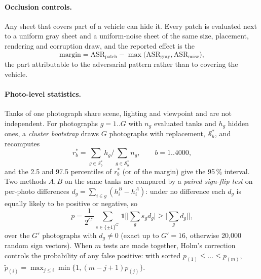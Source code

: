 \documentclass[11pt,a4paper]{article}
\begin{document}
\paragraph{Occlusion controls.} Any sheet that covers part of a vehicle can hide it. Every patch is evaluated next to a uniform gray sheet and a uniform-noise sheet of the same size, placement, rendering and corruption draw, and the reported effect is the
\begin{equation}
\text{margin}=\mathrm{ASR}_{\text{patch}}-\max\big(\mathrm{ASR}_{\text{gray}},\mathrm{ASR}_{\text{noise}}\big),
\end{equation}
the part attributable to the adversarial pattern rather than to covering the vehicle.

\paragraph{Photo-level statistics.} Tanks of one photograph share scene, lighting and viewpoint and are not independent. For photographs $g=1..G$ with $n_g$ evaluated tanks and $h_g$ hidden ones, a \emph{cluster bootstrap} \cite{efron1993,field2007} draws $G$ photographs with replacement, $\mathcal{S}^{*}_b$, and recomputes
\begin{equation}
r^{*}_b=\sum_{g\in\mathcal{S}^{*}_b}h_g\Big/\sum_{g\in\mathcal{S}^{*}_b}n_g,\qquad b=1..4000,
\end{equation}
and the 2.5 and 97.5 percentiles of $r^*_b$ (or of the margin) give the 95\,\% interval. Two methods $A,B$ on the same tanks are compared by a \emph{paired sign-flip test} \cite{good2005} on per-photo differences $d_g=\sum_{i\in g}(h^B_i-h^A_i)$: under no difference each $d_g$ is equally likely to be positive or negative, so
\begin{equation}
p=\frac{1}{2^{G'}}\sum_{s\in\{\pm1\}^{G'}}\mathbb{1}\Big[\big|\textstyle\sum_g s_gd_g\big|\ge\big|\sum_g d_g\big|\Big],
\end{equation}
over the $G'$ photographs with $d_g\ne0$ (exact up to $G'=16$, otherwise 20,000 random sign vectors). When $m$ tests are made together, Holm's correction \cite{holm1979} controls the probability of any false positive: with sorted $p_{(1)}\le\dots\le p_{(m)}$, $\tilde p_{(i)}=\max_{j\le i}\min\{1,(m-j+1)p_{(j)}\}$.
\end{document}
